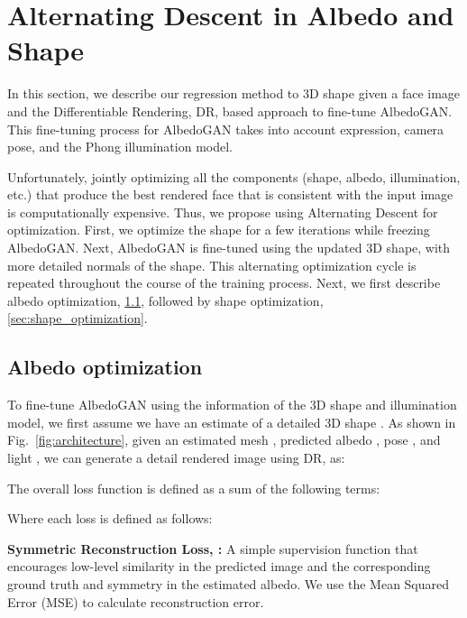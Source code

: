 \documentclass[10pt,twocolumn,letterpaper]{article}
\begin{document}
\vspace{-2mm}




\section{Alternating Descent in Albedo and Shape}

In this section, we describe our regression method to 3D shape given a face image and the Differentiable Rendering, DR, based approach to fine-tune AlbedoGAN. This fine-tuning process for AlbedoGAN takes into account expression, camera pose, and the Phong illumination model. 

Unfortunately, jointly optimizing all the components (shape, albedo, illumination, etc.) that produce the best rendered face that is consistent with the input image is computationally expensive. Thus, we propose using Alternating Descent for optimization. First, we optimize the shape for a few iterations while freezing AlbedoGAN. Next, AlbedoGAN is fine-tuned using the updated 3D shape, with more detailed normals of the shape. This alternating optimization cycle is repeated throughout the course of the training process. Next, we first describe albedo optimization, \ref{sec:albedo_optimization}, followed by shape optimization,  \ref{sec:shape_optimization}.

\subsection{Albedo optimization}
\label{sec:albedo_optimization}
To fine-tune AlbedoGAN using the information of the 3D shape and illumination model, we first assume we have an estimate of a detailed 3D shape . As shown in Fig.~\ref{fig:architecture}, given an estimated mesh , predicted albedo , pose , and light , we can generate a detail rendered image  using DR,  as:
  



The overall loss function  is defined as a sum of the following terms: 

\vspace{-4mm}



Where each loss is defined as follows:





{\bf Symmetric Reconstruction Loss, :} A simple supervision function that encourages low-level similarity in the predicted image and the corresponding ground truth and symmetry in the estimated albedo. We use the Mean Squared Error (MSE) to calculate reconstruction error.
\end{document}
